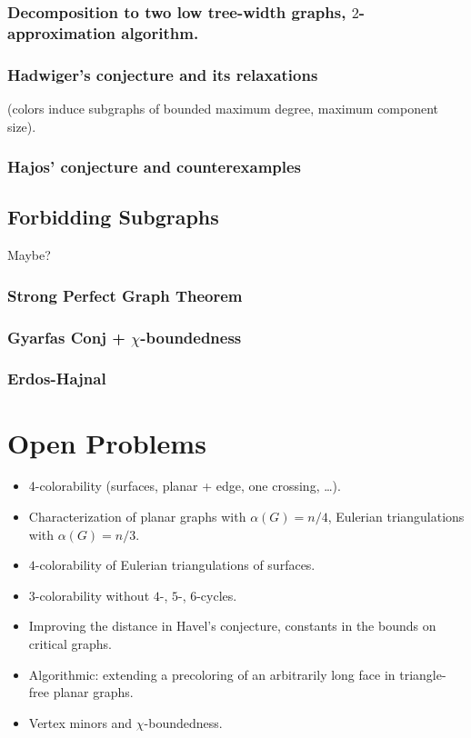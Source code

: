 \documentclass[12pt,twoside,openright,a4paper]{book}
\begin{document}
\section{Decomposition to two low tree-width graphs, $2$-approximation algorithm.}
\section{Hadwiger's conjecture and its relaxations}
(colors induce subgraphs of bounded maximum degree, maximum component size).
\section{Hajos' conjecture and counterexamples}

\chapter{Forbidding Subgraphs}

Maybe?

\section{Strong Perfect Graph Theorem}
\section{Gyarfas Conj + $\chi$-boundedness}
\section{Erdos-Hajnal}

\part{Open Problems}

\begin{itemize}
\item 4-colorability (surfaces, planar + edge, one crossing, \ldots).
\item Characterization of planar graphs with $\alpha(G)=n/4$, Eulerian triangulations with $\alpha(G)=n/3$.
\item $4$-colorability of Eulerian triangulations of surfaces.
\item $3$-colorability without $4$-, $5$-, $6$-cycles.
\item Improving the distance in Havel's conjecture, constants in the bounds on critical graphs.
\item Algorithmic: extending a precoloring of an arbitrarily long face in triangle-free planar graphs.
\item Vertex minors and $\chi$-boundedness.
\end{itemize}

\newpage
\pagestyle{plain}
\printindex



\end{document}

